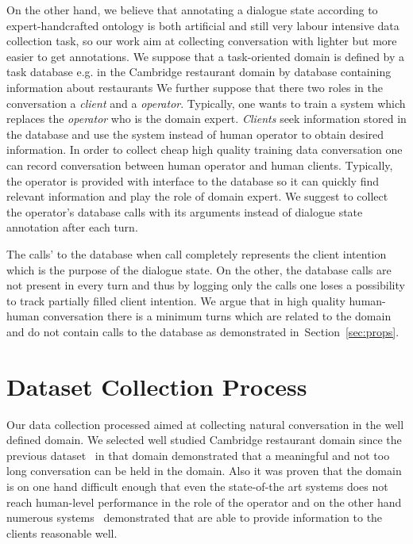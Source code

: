 \documentclass[runningheads,a4paper]{llncs}
\begin{document}
On the other hand, we believe that annotating a dialogue state according to expert-handcrafted ontology is both artificial and still very labour intensive data collection task, so our work aim at collecting conversation with lighter but more easier to get annotations.
We suppose that a task-oriented  domain is defined by a task database e.g. in the Cambridge restaurant domain by database containing information about restaurants
We further suppose that there two roles in the conversation a {\it client} and a {\it operator}.
Typically, one wants to train a system which replaces the {\it operator} who is the domain expert.
{\it Clients} seek information stored in the database and use the system instead of human operator to obtain desired information.
In order to collect cheap high quality training data conversation one can record conversation between human operator and human clients.
Typically, the operator is provided with interface to the database so it can quickly find relevant information and play the role of domain expert.
We suggest to collect the operator's database calls with its arguments instead of dialogue state annotation after each turn.

The calls' to the database when call completely represents the client intention which is the purpose of the dialogue state.
On the other, the database calls are not present in every turn and thus by logging only the calls one loses a possibility to track partially filled client intention.
We argue that in high quality human-human conversation there is a minimum turns which are related to the domain and do not contain calls to the database as demonstrated in~Section~\ref{sec:props}.

\section{Dataset Collection Process}
\label{sec:collection}

Our data collection processed aimed at collecting natural conversation in the well defined domain.
We selected well studied Cambridge restaurant domain since the previous dataset~\cite{williams2013dstc1, henderson2014dstc2, henderson2014dstc3} in that domain demonstrated that a meaningful and not too long conversation can be held in the domain.
Also it was proven that the domain is on one hand difficult enough that even the state-of-the art systems does not reach human-level performance in the role of the operator and on the other hand numerous systems~\cite{young2010hidden, gasic2011line, wen2016network} demonstrated that are able to provide information to the clients reasonable well.
\end{document}
